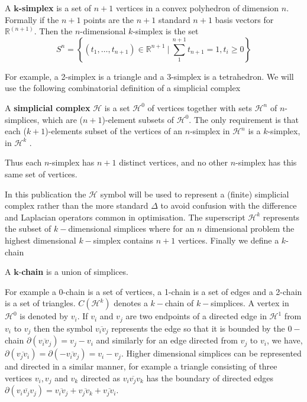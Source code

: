 \begin{definition}
A \textbf{$\mathbf{k}$-simplex} is a set of $n+1$ vertices in a convex polyhedron of dimension $n$. Formally if the $n+1$ points are the $n+1$ standard $n+1$ basis vectors for  $\mathbb{R}^{(n+1)}$. Then the $n$-dimensional $k$-simplex is the set
 $$ 
S^{n}=  \left\{ (t_1 ,\dots , t_{n +1})  \in\mathbb{R}^{n+1} ~|~ \sum^{n +1}_1 t_{n +1}  = 1,  t_i \geq  0  \right\}
$$

\end{definition}
For example, a 2-simplex is a triangle and a 3-simplex is a tetrahedron. We will use the following combinatorial definition of a simplicial complex \citep[p. 107]{Hatcher2011}
\begin{definition}
A \textbf{simplicial complex}  $\mathcal{H}$  is a set $\mathcal{H}^0$  of vertices together with sets $\mathcal{H}^n$  of $n$-simplices, which are ($n + 1$)-element subsets of $\mathcal{H}^0$. The only requirement is that each ($k + 1$)-elements subset of the vertices of an $n$-simplex in $\mathcal{H}^n$ is a $k$-simplex, in $\mathcal{H}^k$ .
\end{definition}
Thus each  $n$-simplex  has $n + 1$ distinct vertices, and no other $n$-simplex has this same set of vertices.

In this publication the $\mathcal{H}$ symbol will be used to represent a (finite) simplicial complex rather than the more standard $\Delta $ to avoid confusion with the difference and Laplacian operators common in optimisation. The superscript $\mathcal{H}^k$ represents the subset of $k-$dimensional simplices where for an $n$ dimensional problem the highest dimensional $k-$simplex contains $n + 1$ vertices. Finally we define a $k$-chain\cite{Henle1979}

\begin{definition}
A $\mathbf{k}$-\textbf{chain} is a union of simplices.
\end{definition}
For example a 0-chain is a set of vertices, a 1-chain is a set of edges and a 2-chain is a set of triangles. $C(\mathcal{H}^k)$ denotes a $k-$chain of $k-$simplices. A vertex in $\mathcal{H}^0$ is denoted by $v_i$. If $v_i$ and $v_j$ are two endpoints of a directed edge in $\mathcal{H}^1$ from $v_i$ to $v_j$ then the symbol $\overline{v_i v_j}$ represents the edge so that it is bounded by the $0-$chain $\partial \left( \overline{v_i v_j} \right) = v_j - v_i$ and similarly for an edge directed from $v_j$ to $v_i$, we have, $\partial \left( \overline{v_j v_i} \right) = \partial \left( - \overline{v_i v_j} \right) = v_i - v_j$. Higher dimensional simplices can be represented and directed in a similar manner, for example a triangle consisting of three vertices $v_i, v_j$ and $v_k$ directed as $\overline{v_i v_j v_k}$  has the boundary of directed edges $\partial \left( \overline{v_i v_j v_j} \right)  = \overline{v_i v_j} + \overline{v_j v_k} + \overline{v_j v_i}$.

